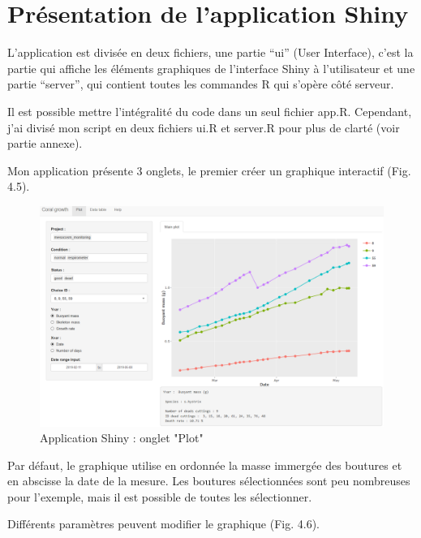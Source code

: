 \documentclass[]{report}
\begin{document}
\section{Présentation de l'application
Shiny}\label{presentation-de-lapplication-shiny}

L'application est divisée en deux fichiers, une partie ``ui'' (User
Interface), c'est la partie qui affiche les éléments graphiques de
l'interface Shiny à l'utilisateur et une partie ``server'', qui contient
toutes les commandes R qui s'opère côté serveur.

Il est possible mettre l'intégralité du code dans un seul fichier app.R.
Cependant, j'ai divisé mon script en deux fichiers ui.R et server.R pour
plus de clarté (voir partie annexe).

\vspace{1 cm}

Mon application présente 3 onglets, le premier créer un graphique
interactif (Fig. 4.5).

\begin{figure}[h!]
\includegraphics[]{../image/notebook-plot1.PNG}
\caption{Application Shiny : onglet "Plot"}
\end{figure}

\vspace{0.5 cm}

Par défaut, le graphique utilise en ordonnée la masse immergée des
boutures et en abscisse la date de la mesure. Les boutures sélectionnées
sont peu nombreuses pour l'exemple, mais il est possible de toutes les
sélectionner.

\vspace{0.5 cm}

Différents paramètres peuvent modifier le graphique (Fig. 4.6).
\end{document}
